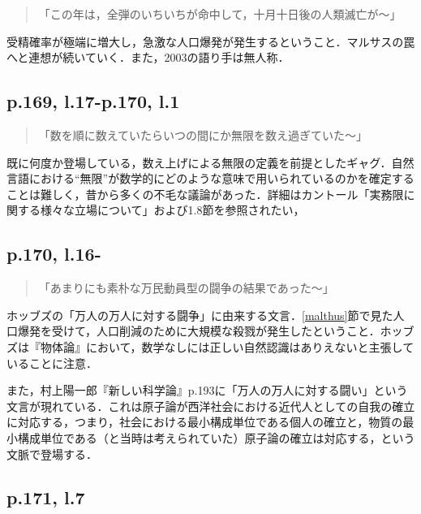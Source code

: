 \documentclass[10pt, a5paper, twoside]{ltjsarticle}
\begin{document}
            \begin{quote}
                「この年は，全弾のいちいちが命中して，十月十日後の人類滅亡が〜」
            \end{quote}

            受精確率が極端に増大し，急激な人口爆発が発生するということ．マルサスの罠へと連想が続いていく．また，2003の語り手は無人称．

        \subsection{p.169, l.17-p.170, l.1}

            \begin{quote}
                「数を順に数えていたらいつの間にか無限を数え過ぎていた〜」
            \end{quote}

            既に何度か登場している，数え上げによる無限の定義を前提としたギャグ．自然言語における“無限”が数学的にどのような意味で用いられているのかを確定することは難しく，昔から多くの不毛な議論があった．詳細はカントール「実務限に関する様々な立場について」\cite{cantor}および\cite{kmoonshine}1.8節を参照されたい，

        \subsection{p.170, l.16-}

            \begin{quote}
                「あまりにも素朴な万民動員型の闘争の結果であった〜」
            \end{quote}

            ホッブズの「万人の万人に対する闘争」\cite{hobbes1}に由来する文言．\ref{malthus}節で見た人口爆発を受けて，人口削減のために大規模な殺戮が発生したということ．ホッブズは『物体論』\cite{hobbes2}において，数学なしには正しい自然認識はありえないと主張していることに注意．

            また，村上陽一郎『新しい科学論』\cite{murakami}p.193に「万人の万人に対する闘い」という文言が現れている．これは原子論が西洋社会における近代人としての自我の確立に対応する，つまり，社会における最小構成単位である個人の確立と，物質の最小構成単位である（と当時は考えられていた）原子論の確立は対応する，という文脈で登場する．

        \subsection{p.171, l.7}
\end{document}
